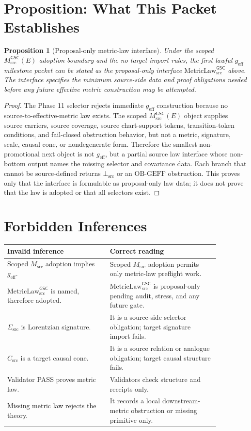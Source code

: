 \documentclass[11pt]{article}
\newcommand{\Msrc}{M_{\mathrm{src}}}
\newcommand{\MsrcGSC}{M_{\mathrm{src}}^{\mathsf{GSC}}}
\newcommand{\MetricLaw}{\mathrm{MetricLaw}_{\mathrm{src}}^{\mathsf{GSC}}}
\newcommand{\BottomSrc}{\bot_{\mathrm{src}}}
\newcommand{\geff}{g_{\mathrm{eff}}}
\newtheorem{proposition}{Proposition}
\begin{document}
\section{Proposition: What This Packet Establishes}

\begin{proposition}[Proposal-only metric-law interface]
Under the scoped \(\MsrcGSC(E)\) adoption boundary and the no-target-import
rules, the first lawful \(\geff\)-milestone packet can be stated as the
proposal-only interface \(\MetricLaw\) above. The interface specifies the
minimum source-side data and proof obligations needed before any future
effective metric construction may be attempted.
\end{proposition}

\begin{proof}
The Phase 11 selector rejects immediate \(\geff\) construction because no
source-to-effective-metric law exists. The scoped \(\MsrcGSC(E)\) object
supplies source carriers, source coverage, source chart-support tokens,
transition-token conditions, and fail-closed obstruction behavior, but not a
metric, signature, scale, causal cone, or nondegenerate form. Therefore the
smallest non-promotional next object is not \(\geff\), but a partial source
law interface whose non-bottom output names the missing selector and
covariance data. Each branch that cannot be source-defined returns
\(\BottomSrc\) or an \(\mathrm{OB\mbox{-}GEFF}\) obstruction. This proves only
that the interface is formulable as proposal-only law data; it does not prove
that the law is adopted or that all selectors exist.
\end{proof}

\section{Forbidden Inferences}

\begin{center}
\begin{tabular}{p{0.42\linewidth}p{0.45\linewidth}}
\toprule
Invalid inference & Correct reading \\
\midrule
Scoped \(\Msrc\) adoption implies \(\geff\). & Scoped \(\Msrc\) adoption permits only metric-law preflight work. \\
\(\MetricLaw\) is named, therefore adopted. & \(\MetricLaw\) is proposal-only pending audit, stress, and any future gate. \\
\(\Sigma_{\mathrm{src}}\) is Lorentzian signature. & It is a source-side selector obligation; target signature import fails. \\
\(C_{\mathrm{src}}\) is a target causal cone. & It is a source relation or analogue obligation; target causal structure fails. \\
Validator PASS proves metric law. & Validators check structure and receipts only. \\
Missing metric law rejects the theory. & It records a local downstream-metric obstruction or missing primitive only. \\
\bottomrule
\end{tabular}
\end{center}
\end{document}
